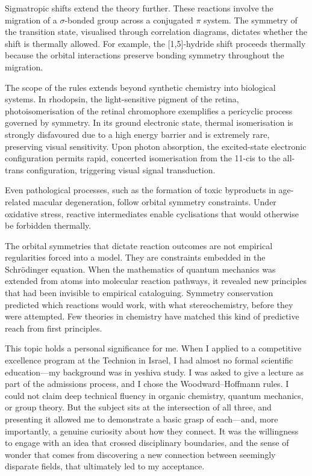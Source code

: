 Sigmatropic shifts extend the theory further. These reactions involve the migration of a $\sigma$-bonded group across a conjugated $\pi$ system. The symmetry of the transition state, visualised through correlation diagrams, dictates whether the shift is thermally allowed. For example, the [1,5]-hydride shift proceeds thermally because the orbital interactions preserve bonding symmetry throughout the migration.

The scope of the rules extends beyond synthetic chemistry into biological systems. In rhodopsin, the light-sensitive pigment of the retina, photoisomerisation of the retinal chromophore exemplifies a pericyclic process governed by symmetry. In its ground electronic state, thermal isomerisation is strongly disfavoured due to a high energy barrier and is extremely rare, preserving visual sensitivity. Upon photon absorption, the excited-state electronic configuration permits rapid, concerted isomerisation from the 11-cis to the all-trans configuration, triggering visual signal transduction.

Even pathological processes, such as the formation of toxic byproducts in age-related macular degeneration, follow orbital symmetry constraints. Under oxidative stress, reactive intermediates enable cyclisations that would otherwise be forbidden thermally.
\newpage
\begin{commentary}
The orbital symmetries that dictate reaction outcomes are not empirical regularities forced into a model. They are constraints embedded in the Schrödinger equation. When the mathematics of quantum mechanics was extended from atoms into molecular reaction pathways, it revealed new principles that had been invisible to empirical cataloguing. Symmetry conservation predicted which reactions would work, with what stereochemistry, before they were attempted. Few theories in chemistry have matched this kind of predictive reach from first principles.

This topic holds a personal significance for me. When I applied to a competitive excellence program at the Technion in Israel, I had almost no formal scientific education—my background was in yeshiva study. I was asked to give a lecture as part of the admissions process, and I chose the Woodward–Hoffmann rules. I could not claim deep technical fluency in organic chemistry, quantum mechanics, or group theory. But the subject sits at the intersection of all three, and presenting it allowed me to demonstrate a basic grasp of each—and, more importantly, a genuine curiosity about how they connect. It was the willingness to engage with an idea that crossed disciplinary boundaries, and the sense of wonder that comes from discovering a new connection between seemingly disparate fields, that ultimately led to my acceptance.
\end{commentary}

